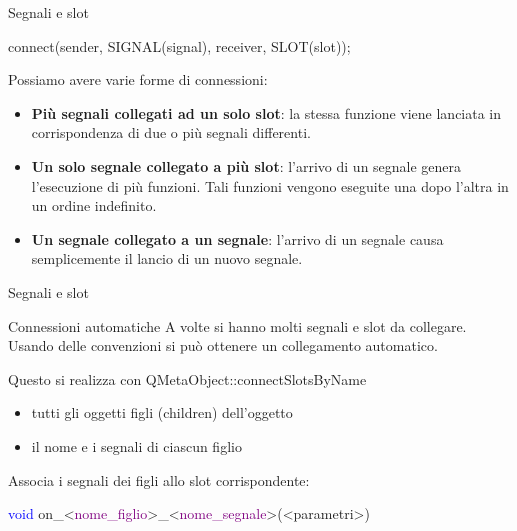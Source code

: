 \documentclass[10pt]{beamer}
\begin{document}
\begin{frame}{Segnali e slot}
	\begin{block}{}
		\begin{center}
			{\ttfamily connect(sender, SIGNAL(signal), receiver, SLOT(slot));}
		\end{center}
	\end{block}
	\bigskip
	Possiamo avere varie forme di connessioni:
	\begin{itemize}
		\item \textbf{Più segnali collegati ad un solo slot}: la stessa funzione viene lanciata in corrispondenza di due o più segnali differenti.
		\item \textbf{Un solo segnale collegato a più slot}: l'arrivo di un segnale genera l'esecuzione di più funzioni. Tali funzioni vengono eseguite una dopo l'altra in un ordine indefinito.
		\item \textbf{Un segnale collegato a un segnale}: l'arrivo di un segnale causa semplicemente il lancio di un nuovo segnale.
	\end{itemize}
\end{frame}

\begin{frame}{Segnali e slot}
	\begin{block}{Connessioni automatiche}
		A volte si hanno molti segnali e slot da collegare. Usando delle convenzioni si può ottenere un collegamento automatico. 
		
		Questo si realizza con {\ttfamily QMetaObject::connectSlotsByName}
		\begin{itemize}
			\item tutti gli oggetti figli (children) dell'oggetto
			\item il nome e i segnali di ciascun figlio
		\end{itemize}
		
		\bigskip
		Associa i segnali dei figli allo slot corrispondente:
		
		\bigskip
		\centering
		{\ttfamily \textcolor{blue}{void} on\_<\textcolor{purple}{nome\_figlio}>\_<\textcolor{purple}{nome\_segnale}>(<parametri>)}
	\end{block}
\end{frame}
\end{document}
